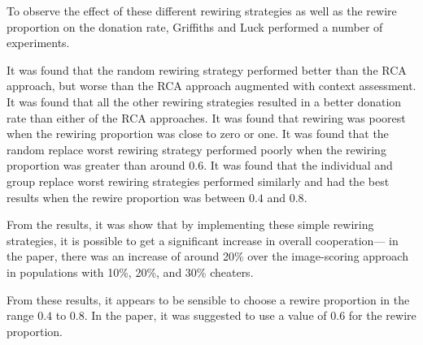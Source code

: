 To observe the effect of these different rewiring strategies as well as the
rewire proportion on the donation rate, Griffiths and Luck performed a number
of experiments.

It was found that the random rewiring strategy performed better than the RCA
approach, but worse than the RCA approach augmented with context assessment. It was found that all the other rewiring strategies resulted
in a better donation rate than either of the RCA approaches. It was found that
rewiring was poorest when the rewiring proportion was close to zero or one.
It was found that the random replace worst rewiring strategy performed poorly
when the rewiring proportion was greater than around $0.6$. It was found that
the individual and group replace worst rewiring strategies performed similarly
and had the best results when the rewire proportion was between $0.4$ and $0.8$.

From the results, it was show that by implementing these simple rewiring
strategies, it is possible to get a significant increase in overall cooperation---
in the paper, there was an increase of around 20\% over the image-scoring approach
in populations with 10\%, 20\%, and 30\% cheaters.

From these results, it appears to be sensible to choose a rewire proportion in
the range $0.4$ to $0.8$. In the paper, it was suggested to use a value of $0.6$
for the rewire proportion.
